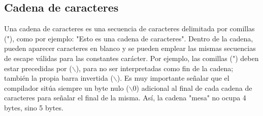 \subsection{Cadena de caracteres}

Una cadena de caracteres es una secuencia de caracteres delimitada por comillas ("), como
por ejemplo: "Esto es una cadena de caracteres". Dentro de la cadena, pueden aparecer caracteres en
blanco y se pueden emplear las mismas secuencias de escape válidas para las constantes carácter.
Por ejemplo, las comillas (") deben estar precedidas por ($\backslash$), para no ser interpretadas como fin
de la cadena; también la propia barra invertida ($\backslash$). Es muy importante señalar que el compilador
sitúa siempre un byte nulo ($\backslash$0) adicional al final de cada cadena de caracteres para señalar el final de la misma. Así, la cadena "mesa" no ocupa 4 bytes, sino 5 bytes.